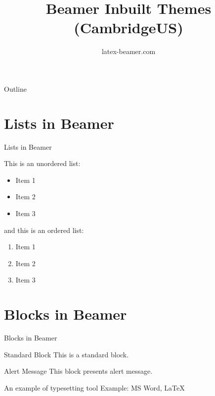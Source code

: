\documentclass[aspectratio=169]{beamer}
\title{Beamer Inbuilt Themes (CambridgeUS)}
\author{latex-beamer.com}
\begin{document}
\begin{frame}{Outline}
    \tableofcontents
\end{frame}

\section{Lists in Beamer}

\begin{frame}{Lists in Beamer}

This is an unordered list:
\begin{itemize}
    \item Item 1
    \item Item 2
    \item Item 3
\end{itemize}

and this is an ordered list:
\begin{enumerate}
    \item Item 1
    \item Item 2
    \item Item 3
\end{enumerate}

\end{frame}

\section{Blocks in Beamer}
\begin{frame}{Blocks in Beamer}
    \begin{block}{Standard Block}
        This is a standard block.
    \end{block}
    \begin{alertblock}{Alert Message}
        This block presents alert message.
    \end{alertblock}
    \begin{exampleblock}{An example of typesetting tool}
        Example: MS Word, \LaTeX{}
    \end{exampleblock}
\end{frame} 
\end{document}
